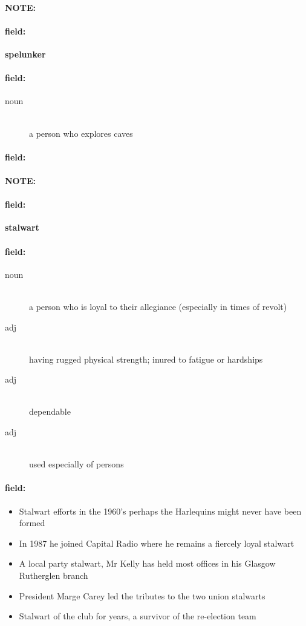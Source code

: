 \documentclass[12pt]{article}
\newenvironment{note}{\paragraph{NOTE:}}{}
\newenvironment{field}{\paragraph{field:}}{}
\begin{document}
\begin{note}
\begin{field}
\textbf{\large spelunker}
\end{field}


\begin{field}
\begin{description}
\item[noun] \hfill \\ 
a person who explores caves

\end{description}
\end{field}

\begin{field}
\end{field}
\end{note}
\begin{note}
\begin{field}
\textbf{\large stalwart}
\end{field}


\begin{field}
\begin{description}
\item[noun] \hfill \\ 
a person who is loyal to their allegiance (especially in times of revolt)

\item[adj] \hfill \\ 
having rugged physical strength; inured to fatigue or hardships

\item[adj] \hfill \\ 
dependable

\item[adj] \hfill \\ 
used especially of persons

\end{description}
\end{field}

\begin{field}
\begin{itemize}
\item Stalwart efforts in the 1960's perhaps the Harlequins might never have been formed
\item In 1987 he joined Capital Radio where he remains a fiercely loyal stalwart
\item A local party stalwart, Mr Kelly has held most offices in his Glasgow Rutherglen branch
\item President Marge Carey led the tributes to the two union stalwarts
\item Stalwart of the club for years, a survivor of the re-election team
\end{itemize}
\end{field}
\end{note}
\end{document}
